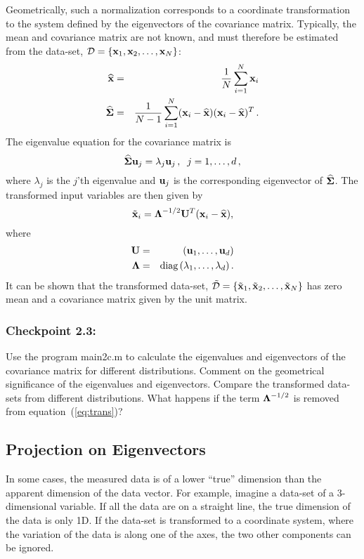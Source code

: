 \documentclass[times,12pt]{article}    %
\def\x{{\bf x}}
\def\D{\mathcal{D}}
\def\S{\text{\boldmath $\Sigma$}}
\def\L{\text{\boldmath $\Lambda$}}
\def\U{{\bf U}}
\def\u{{\bf u}}
\begin{document}
Geometrically, such a normalization corresponds to a coordinate
transformation to the system defined by the eigenvectors of
the covariance matrix. Typically, the mean and covariance matrix are
not known, and must therefore be estimated from the data-set, $\D =
\{\x_1, \x_2, \ldots ,\x_N\}$:
\begin{eqnarray}
  \widehat{\x} & = & \frac{1}{N}\sum_{i=1}^N \x_i\\
  \widehat{\S} & = & \frac{1}{N-1}\sum_{i=1}^N
  (\x_i-\widehat{\x})(\x_i-\widehat{\x})^T\, .
\end{eqnarray}
The eigenvalue equation for the covariance matrix is
\begin{equation}
 \widehat{\S}\u_j = \lambda_j\u_j\,,\;\; j=1,\ldots,d\,,
\end{equation}
where $\lambda_j$ is the $j$'th eigenvalue and $\u_j$ is the
corresponding eigenvector of $\widehat{\S}$. The transformed input variables are
then given by
\begin{equation}
  \label{eq:trans}
  \tilde{\x}_i = \L^{-1/2}\U^T(\x_i-\widehat{\x}),
\end{equation}
where
\begin{eqnarray}
  \U &=& (\u_1,\ldots, \u_d)\\
  \L &=& \text{diag}\left(\lambda_1, \ldots, \lambda_d \right).
\end{eqnarray}
It can be shown that the transformed data-set, $\tilde{\D} =
\{\tilde{\x}_1, \tilde{\x}_2, \ldots ,\tilde{\x}_N\}$ has zero mean
and a covariance matrix given by the unit matrix.

\subsubsection*{Checkpoint 2.3:}
Use the program {\sf main2c.m} to calculate the eigenvalues and
eigenvectors of the covariance matrix for different
distributions. Comment on the geometrical significance of the
eigenvalues and eigenvectors. Compare the transformed data-sets from
different distributions. What happens if the term $\L^{-1/2}$ is
removed from equation~(\ref{eq:trans})?

\subsection*{Projection on Eigenvectors}
In some cases, the measured data is of a lower ``true'' dimension than
the apparent dimension of the data vector. For example, imagine a data-set of a
3-dimensional variable. If all the data are on a straight line, the
true dimension of the data is only 1D. If the data-set is
transformed to a coordinate system, where the variation of
the data is along one of the axes, the two other components can be
ignored.
\end{document}

